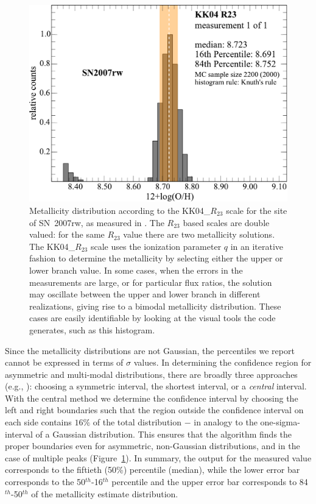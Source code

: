 \documentclass{emulateapj}
\begin{document}
\begin{figure}[ht!]
\includegraphics[width=1.0\columnwidth]{SN2007rw_n2000_KK04_R23_1.pdf}
\caption{Metallicity distribution according to the KK04\_$R_{23}$ scale for the site of SN~2007rw, as measured in  \citet{modjaz11}. The $R_{23}$ based scales are double valued: for the same $R_{23}$ value there are two metallicity solutions. The KK04\_$R_{23}$ scale uses the ionization parameter $q$ in an iterative fashion to determine the metallicity by selecting either the upper or lower branch value. In some cases, when the errors in the measurements are large, or for particular flux ratios, the solution may oscillate between the upper and lower branch in different realizations, giving rise to a bimodal metallicity distribution. These cases are easily identifiable by looking at the visual tools the code generates, such as this histogram.}\label{metallicity_bimodal}
\end{figure}

Since the metallicity distributions are not Gaussian, the percentiles we report cannot be expressed in terms of $\sigma$ values. In determining the confidence region for asymmetric and multi-modal distributions, there are broadly three approaches (e.g., \citealt{andrae10}): choosing a symmetric interval, the shortest interval, or a \emph{central} interval.  With the central method we determine the confidence interval by choosing the left and right boundaries such that the region outside the confidence interval on each side contains $16\%$ of the total distribution $-$ in analogy to the one-sigma-interval of a Gaussian distribution. This ensures that the algorithm finds the proper boundaries even for asymmetric, non-Gaussian distributions, and in the case of multiple peaks (Figure~\ref{metallicity_bimodal}). In summary, the output for the measured value corresponds to the fiftieth (50\%) percentile (median), while the lower error bar corresponds to the 50$^{th}$-16$^{th}$ percentile and the upper error bar corresponds to 84$^{th}$-50$^{th}$ of the metallicity estimate distribution. 
\end{document}
